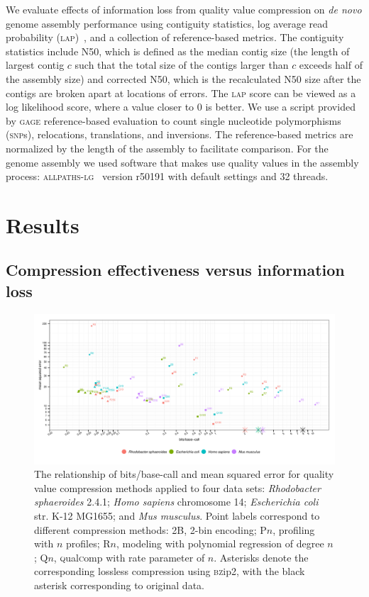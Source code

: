 \documentclass{bioinfo}
\begin{document}
\begin{methods}
We evaluate effects of information loss from quality value compression
on \emph{de novo} genome assembly performance using contiguity
statistics, log average read probability
(\textsc{lap})~\citep{Ghodsi:2013hb}, and a collection of
reference-based metrics. The contiguity statistics include N50, which
is defined as the median contig size (the length of largest contig $c$
such that the total size of the contigs larger than $c$ exceeds half
of the assembly size) and corrected N50, which is the recalculated N50
size after the contigs are broken apart at locations of errors. The
\textsc{lap} score can be viewed as a log likelihood score, where a
value closer to 0 is better. We use a script provided by \textsc{gage}
reference-based evaluation to count single nucleotide polymorphisms
(\textsc{snp}s), relocations, translations, and inversions. The
reference-based metrics are normalized by the length of the assembly
to facilitate comparison. For the genome assembly we used software
that makes use quality values in the assembly process:
\textsc{allpaths-lg}~\citep{Gnerre:2011kx} version r50191 with default
settings and 32 threads.

\end{methods}

\section{Results}

\subsection{Compression effectiveness versus information loss}

\begin{figure}[!tb]
\centerline{\includegraphics[width=7in]{compression_results.pdf}}
\caption{The relationship of bits/base-call and mean squared error for
  quality value compression methods applied to four data sets:
  \textit{Rhodobacter sphaeroides} 2.4.1; \textit{Homo sapiens}
  chromosome 14; \textit{Escherichia coli} str. K-12 MG1655; and
  \textit{Mus musculus}. Point labels correspond to different
  compression methods: 2B, 2-bin encoding; P$n$, profiling with $n$
  profiles; R$n$, modeling with polynomial regression of degree $n$;
  Q$n$, \textsc{q}ual\textsc{c}omp with rate parameter of
  $n$. Asterisks denote the corresponding lossless compression using
  \textsc{bz}ip2, with the black asterisk corresponding to original
  data.}
\label{fig:mse_vs_bpbp}
\end{figure}
\end{document}
